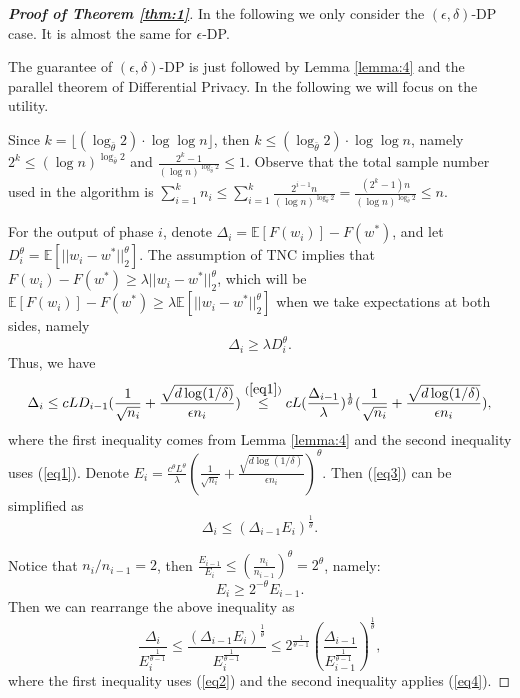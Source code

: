 \documentclass[12pt]{alt2022} %
\begin{document}
	\begin{proof}[{\bf Proof of Theorem \ref{thm:1}}]
		In the following we only consider the $(\epsilon, \delta)$-DP case. It is almost the same for $\epsilon$-DP. 
		
		The guarantee of $(\epsilon,\delta)$-DP is just followed by Lemma \ref{lemma:4} and the parallel theorem of Differential Privacy. In the following we will focus on the utility. 
		
		Since $k=\lfloor (\log_{\bar{\theta}}2)\cdot \log\log n\rfloor$, then $k\leq (\log_{\bar{\theta}}2)\cdot \log\log n$, namely $2^k\leq (\log n)^{\log_{\bar{\theta}}2}$ and $\frac{2^k-1}{(\log n)^{\log_{\bar{\theta}}2}}\leq 1$.
		Observe that the total sample number used in the algorithm is $\sum_{i=1}^{k} n_i \leq  \sum_{i=1}^{k}\frac{2^{i-1} n}{(\log n)^{\log _{\bar{\theta}} 2}}=\frac{(2^k-1) n}{(\log n)^{\log _{\bar{\theta}} 2}}\leq n$.
		
		For the output of phase $i$, denote $\Delta_i=\mathbb{E}[F(w_i)]-F(w^*)$, and let $D_i^{\theta}=\mathbb{E}[||w_i-w^*||_2^{\theta}]$.
		The assumption of TNC implies that $F(w_i)- F(w^*)\geq \lambda||w_i-w^*||_2^{\theta}$, which will be  $\mathbb{E}[F(w_i)]-F(w^*)\geq \lambda \mathbb{E}[||w_i-w^*||_2^{\theta}]$ when we take expectations at both sides, namely
		\begin{equation}\label{eq1}
		\Delta_i\geq \lambda D_i^{\theta}. 
		\end{equation}
		Thus, we have 
		\begin{equation}\label{eq3}
		\Delta_{i}\leq cLD_{i-1}(\frac{1}{\sqrt{n_{i}}}+\frac{\sqrt{d\log(1/\delta)}}{\epsilon n_{i}})\overset{(\ref{eq1})}{\leq} cL (\frac{\Delta_{i-1}}{\lambda})^{\frac{1}{\theta}}(\frac{1}{\sqrt{n_{i}}}+\frac{\sqrt{d\log(1/\delta)}}{\epsilon n_{i}}),
		\end{equation}
		where the first inequality comes from Lemma \ref{lemma:4} and the second inequality uses (\ref{eq1}).
		Denote $E_i=\frac{c^{\theta}L^{\theta}}{\lambda}(\frac{1}{\sqrt{n_i}}+\frac{\sqrt{d\log(1/\delta)}}{\epsilon n_i})^{\theta}$.
		Then (\ref{eq3}) can be simplified as 
		\begin{equation}\label{eq2}
		\Delta_{i}\leq (\Delta_{i-1}E_i)^{\frac{1}{\theta}}.
		\end{equation}
		
		Notice that $n_{i}/n_{i-1}=2$, then $\frac{E_{i-1}}{E_{i}}\leq (\frac{n_{i}}{n_{i-1}})^{\theta}=2^{\theta}$, namely:
		\begin{equation}\label{eq4}
		E_{i}\geq 2^{-\theta} E_{i-1}.
		\end{equation}
		Then we can rearrange the above inequality as
		\begin{equation}\label{eq5}
		\frac{\Delta_{i}}{E_{i}^{\frac{1}{\theta-1}}}\leq \frac{(\Delta_{i-1}E_i)^{\frac{1}{\theta}}}{E_{i}^{\frac{1}{\theta-1}}} \leq2^{\frac{1}{\theta-1}}\left(\frac{\Delta_{i-1}}{E_{i-1}^{\frac{1}{\theta-1}}}\right)^{\frac{1}{\theta}},
		\end{equation}
		where the first inequality uses (\ref{eq2}) and the second inequality applies (\ref{eq4}).
		

\end{proof}
\end{document}
